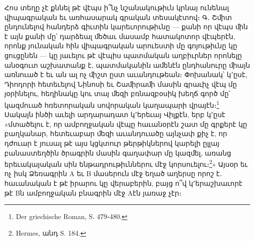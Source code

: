 \documentclass{article}
\begin{document}
{Հոս տեղը չէ քննել թէ վէպս ի՞նչ նշանակութիւն կրնայ ունենալ վիպագրական եւ առհասարակ գրական տեսակէտով։ Գ․ Շﬕտ ընդունելով հանդերձ գիւտին կարեւորութիւնը — քանի որ վէպս ﬕն է այն քանի մը՝ դարձեալ ﬔծաւ մասամբ հատակոտոր վէպերէն, որոնք յունական հին վիպագրական արուեստի մը գոյութիւնը կը ցուցընեն — կը յաւելու թէ վէպիս պատմական աղբիւրներ որոնելը անօգուտ աշխատանք է․ պատմականին աﬔնէն ընդհանուրը ﬕայն առնուած է եւ ան ալ ոչ ﬕշտ ըստ աւանդութեան։ Փոխանակ՝ կ՚ըսէ, Դիոդորի հետեւելով Նինոսի եւ Շաﬕրաﬕ մասին գրաւիչ վէպ մը յօրինելու, հեղինակը կու տայ ﬔզի բռնազբօսիկ խեղճ գործ մը՝ կազմուած հռետորական սովորական կաղապարի վրայէն։\footnote{Der griechische Roman, S. 479֊480.} Սակայն ինծի աւելի արդարադատ կ՚երեւայ Վիլքէն, երբ կ՚ըսէ «մտածելու է, որ ամբողջական վէպը հաւանօրէն շատ մը գրքերէ կը բաղկանար, հետեւաբար ﬔզի աւանդուածը այնչափ քիչ է, որ դժուար է յուսալ թէ այս կցկտուր թերթիկներով կարելի ըլլայ բանաստեղծին ծրագրին մասին գաղափար մը կազﬔլ, առանց երեւակայական սին ենթադրութիւններու մէջ կորսուելու։\footnote{Hermes, անդ S. 184.}» Այսօր եւ ոչ իսկ Ձեռագրին Α եւ Β մասերուն մէջ եղած աղերսը որոշ է․ հաւանական է թէ իրարու կը վերաբերին, բայց ո՞վ կ՚երաշխաւորէ թէ Βն ամբողջական բնագրին մէջ Αէն յառաջ չէր։

}
\end{document}
